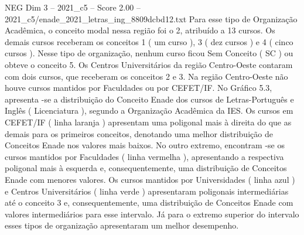 \begin{textsample}{NEG Dim 3 – 2021\_c5 – Score 2.00 – 2021\_c5/enade\_2021\_letras\_ing\_8809dcbd12.txt}
Para esse tipo de Organização Acadêmica, o conceito modal nessa região foi o 2, atribuído a 13 cursos.
Os demais cursos receberam os conceitos 1 ( um curso ), 3 ( dez cursos ) e 4 ( cinco cursos ).
Nesse tipo de organização, nenhum curso ficou Sem Conceito ( SC ) ou obteve o conceito 5.
Os Centros Universitários da região Centro-Oeste contaram com dois cursos, que receberam os conceitos 2 e 3.
Na região Centro-Oeste não houve cursos mantidos por Faculdades ou por CEFET/IF.
No Gráfico 5.3, apresenta -se a distribuição do Conceito Enade dos cursos de Letras-Português e Inglês ( Licenciatura ), segundo a Organização Acadêmica da IES.
Os cursos em CEFET/IF ( linha laranja ) apresentam uma poligonal mais à direita do que as demais para os primeiros conceitos, denotando uma melhor distribuição de Conceitos Enade nos valores mais baixos.
No outro extremo, encontram -se os cursos mantidos por Faculdades ( linha vermelha ), apresentando a respectiva poligonal mais à esquerda e, consequentemente, uma distribuição de Conceitos Enade com menores valores.
Os cursos mantidos por Universidades ( linha azul ) e Centros Universitários ( linha verde ) apresentaram poligonais intermediárias até o conceito 3 e, consequentemente, uma distribuição de Conceitos Enade com valores intermediários para esse intervalo.
Já para o extremo superior do intervalo esses tipos de organização apresentaram um melhor desempenho.

\end{textsample}
